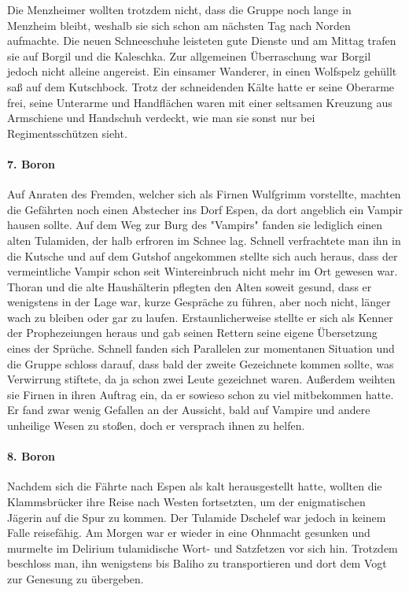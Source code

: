 Die Menzheimer wollten trotzdem nicht, dass die Gruppe noch lange in Menzheim bleibt, weshalb sie sich schon am nächsten Tag nach Norden aufmachte. Die neuen Schneeschuhe leisteten gute Dienste und am Mittag trafen sie auf Borgil und die Kaleschka. Zur allgemeinen Überraschung war Borgil jedoch nicht alleine angereist. Ein einsamer Wanderer, in einen Wolfspelz gehüllt saß auf dem Kutschbock. Trotz der schneidenden Kälte hatte er seine Oberarme frei, seine Unterarme und Handflächen waren mit einer seltsamen Kreuzung aus Armschiene und Handschuh verdeckt, wie man sie sonst nur bei Regimentsschützen sieht.

\paragraph{7. Boron}
Auf Anraten des Fremden, welcher sich als Firnen Wulfgrimm vorstellte, machten die Gefährten noch einen Abstecher ins Dorf Espen, da dort angeblich ein Vampir hausen sollte. Auf dem Weg zur Burg des "Vampirs" fanden sie lediglich einen alten Tulamiden, der halb erfroren im Schnee lag. Schnell verfrachtete man ihn in die Kutsche und auf dem Gutshof angekommen stellte sich auch heraus, dass der vermeintliche Vampir schon seit Wintereinbruch nicht mehr im Ort gewesen war. Thoran und die alte Haushälterin pflegten den Alten soweit gesund, dass er wenigstens in der Lage war, kurze Gespräche zu führen, aber noch nicht, länger wach zu bleiben oder gar zu laufen. Erstaunlicherweise stellte er sich als Kenner der Prophezeiungen heraus und gab seinen Rettern seine eigene Übersetzung eines der Sprüche. Schnell fanden sich Parallelen zur momentanen Situation und die Gruppe schloss darauf, dass bald der zweite Gezeichnete kommen sollte, was Verwirrung stiftete, da ja schon zwei Leute gezeichnet waren. Außerdem weihten sie Firnen in ihren Auftrag ein, da er sowieso schon zu viel mitbekommen hatte. Er fand zwar wenig Gefallen an der Aussicht, bald auf Vampire und andere unheilige Wesen zu stoßen, doch er versprach ihnen zu helfen.

\paragraph{8. Boron}
Nachdem sich die Fährte nach Espen als kalt herausgestellt hatte, wollten die Klammsbrücker ihre Reise nach Westen fortsetzten, um der enigmatischen Jägerin auf die Spur zu kommen. Der Tulamide Dschelef war jedoch in keinem Falle reisefähig. Am Morgen war er wieder in eine Ohnmacht gesunken und murmelte im Delirium tulamidische Wort- und Satzfetzen vor sich hin. Trotzdem beschloss man, ihn wenigstens bis Baliho zu transportieren und dort dem Vogt zur Genesung zu übergeben.

